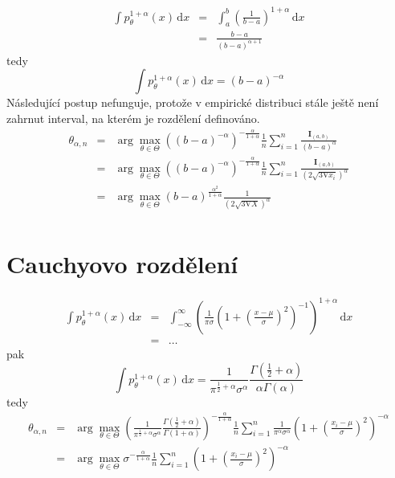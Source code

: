 \documentclass[11pt, a4paper]{article}
\newcommand{\intpa}{\int p_\theta^{1+\alpha}(x) \, \mathrm{d}x }
\newcommand{\amtiT}{\arg \max_{\theta \in \Theta}}
\begin{document}
\begin{eqnarray}
\intpa & = & \int_{a }^{b } \left( \frac{1}{b-a} \right) ^{1 + \alpha} \, \mathrm{d}x \nonumber\\
& = & \frac{b-a}{(b-a)^{\alpha+1}} \nonumber
\end{eqnarray} 
tedy
\begin{equation}
\intpa = (b-a)^{-\alpha}
\end{equation}
Následující postup nefunguje, protože v empirické distribuci stále ještě není zahrnut interval, na kterém je rozdělení definováno. 
\begin{eqnarray}
	\theta_{\alpha,n} & = & \amtiT \left( (b-a)^{-\alpha} \right)^{-\frac{\alpha}{1+\alpha}} \frac{1}{n} \sum_{i=1}^n \frac{\mathbf{I}_{(a,b)}}{(b-a)^\alpha} \nonumber\\
	& = & \amtiT \left( (b-a)^{-\alpha} \right)^{-\frac{\alpha}{1+\alpha}} \frac{1}{n} \sum_{i=1}^n \frac{\mathbf{I}_{(a,b)}}{\left(2\sqrt{3\mathrm{V}x_i}\right)^\alpha} \nonumber\\
	& = & \amtiT (b-a)^{\frac{\alpha^2}{1+\alpha}}\frac{1}{\left(2\sqrt{3\mathrm{V}X}\right)^\alpha}	\nonumber\\
\end{eqnarray}


\section{Cauchyovo rozdělení} %

\begin{eqnarray}
\intpa & = & \int_{-\infty }^{\infty } \left( \frac{1}{\pi \sigma} \left( 1 + \left( \frac{x - \mu}{\sigma} \right) ^2 \right)^{-1} \right)^{1+\alpha} \, \mathrm{d}x \nonumber\\
& = & \ldots \nonumber
\end{eqnarray} 
pak
\begin{equation}
\intpa = \frac{1}{\pi^{\frac{1}{2}+\alpha}\sigma^\alpha} \frac{\Gamma(\frac{1}{2} + \alpha)}{\alpha\Gamma(\alpha)}
\end{equation}
tedy
\begin{eqnarray}
	\theta_{\alpha,n} & = & \amtiT \left( \frac{1}{\pi^{\frac{1}{2}+\alpha}\sigma^\alpha} \frac{\Gamma(\frac{1}{2} + \alpha)}{\Gamma(1+\alpha)} \right)^{-\frac{\alpha}{1+\alpha}} 
	\frac{1}{n} \sum_{i=1}^n \frac{1}{\pi^\alpha\sigma^\alpha}\left( 1 + \left( \frac{x_i-\mu}{\sigma} \right)^2 \right)^{-\alpha} \nonumber \\
	& = & \amtiT \sigma^{-\frac{\alpha}{1+\alpha}} \frac{1}{n} \sum_{i=1}^n \left( 1 + \left( \frac{x_i-\mu}{\sigma} \right)^2 \right)^{-\alpha} \nonumber
\end{eqnarray}
\end{document}
